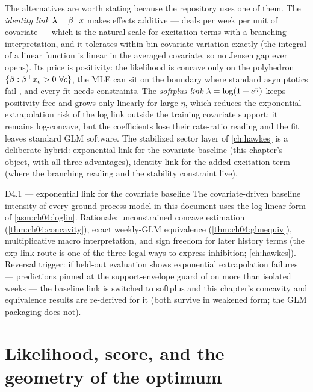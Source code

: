 The alternatives are worth stating because the repository uses one of them.
The \emph{identity link} $\lambda = \beta^{\top}x$ makes effects additive ---
deals per week per unit of covariate --- which is the natural scale for
excitation terms with a branching interpretation, and it tolerates
within-bin covariate variation exactly (the integral of a linear function
is linear in the averaged covariate, so no Jensen gap ever opens). Its
price is positivity: the likelihood is concave only on the polyhedron
$\{\beta : \beta^{\top}x_c > 0\ \forall c\}$, the MLE can sit on the
boundary where standard asymptotics fail \citep{selfliang1987}, and every
fit needs constraints. The \emph{softplus link} $\lambda = \log(1 +
e^{\eta})$ keeps positivity free and grows only linearly for large $\eta$,
which reduces the exponential extrapolation risk of the log link outside
the training covariate support; it remains log-concave, but the
coefficients lose their rate-ratio reading and the fit leaves standard GLM
software. The stabilized sector layer of \cref{ch:hawkes} is a deliberate
hybrid: exponential link for the covariate baseline (this chapter's
object, with all three advantages), identity link for the added excitation
term (where the branching reading and the stability constraint live).

\begin{decision}{D4.1 --- exponential link for the covariate baseline}
The covariate-driven baseline intensity of every ground-process model in
this document uses the log-linear form of \cref{asm:ch04:loglin}.
Rationale: unconstrained concave estimation (\cref{thm:ch04:concavity}),
exact weekly-GLM equivalence (\cref{thm:ch04:glmequiv}), multiplicative
macro interpretation, and sign freedom for later history terms (the
exp-link route is one of the three legal ways to express inhibition;
\cref{ch:hawkes}). Reversal trigger: if held-out evaluation shows
exponential extrapolation failures --- predictions pinned at the
support-envelope guard of  on more than
isolated weeks --- the baseline link is switched to softplus and this
chapter's concavity and equivalence results are re-derived for it (both
survive in weakened form; the GLM packaging does not).
\end{decision}

\section{Likelihood, score, and the geometry of the optimum}\label{ch04:sec:likelihood}

